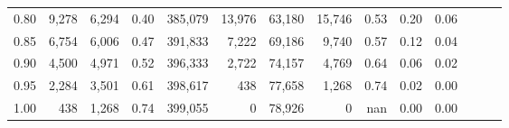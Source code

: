 \begin{tabular}{rrrrrrrrrrrrrr}
0.80 &   9,278 &  6,294 &  0.40 &  385,079 &   13,976 &  63,180 &  15,746 &  0.53 &  0.20 &      0.06 \\
0.85 &   6,754 &  6,006 &  0.47 &  391,833 &    7,222 &  69,186 &   9,740 &  0.57 &  0.12 &      0.04 \\
0.90 &   4,500 &  4,971 &  0.52 &  396,333 &    2,722 &  74,157 &   4,769 &  0.64 &  0.06 &      0.02 \\
0.95 &   2,284 &  3,501 &  0.61 &  398,617 &      438 &  77,658 &   1,268 &  0.74 &  0.02 &      0.00 \\
1.00 &     438 &  1,268 &  0.74 &  399,055 &        0 &  78,926 &       0 &   nan &  0.00 &      0.00 \\
\bottomrule
\end{tabular}
